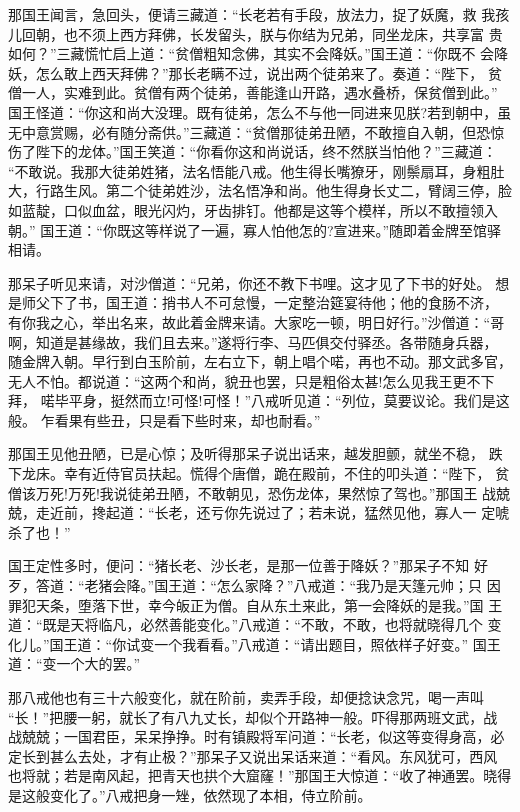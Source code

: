 那国王闻言，急回头，便请三藏道：“长老若有手段，放法力，捉了妖魔，救
我孩儿回朝，也不须上西方拜佛，长发留头，朕与你结为兄弟，同坐龙床，共享富
贵如何？”三藏慌忙启上道：“贫僧粗知念佛，其实不会降妖。”国王道：“你既不
会降妖，怎么敢上西天拜佛？”那长老瞒不过，说出两个徒弟来了。奏道：“陛下，
贫僧一人，实难到此。贫僧有两个徒弟，善能逢山开路，遇水叠桥，保贫僧到此。”
国王怪道：“你这和尚大没理。既有徒弟，怎么不与他一同进来见朕?若到朝中，虽
无中意赏赐，必有随分斋供。”三藏道：“贫僧那徒弟丑陋，不敢擅自入朝，但恐惊
伤了陛下的龙体。”国王笑道：“你看你这和尚说话，终不然朕当怕他？”三藏道：
“不敢说。我那大徒弟姓猪，法名悟能八戒。他生得长嘴獠牙，刚鬃扇耳，身粗肚
大，行路生风。第二个徒弟姓沙，法名悟净和尚。他生得身长丈二，臂阔三停，脸
如蓝靛，口似血盆，眼光闪灼，牙齿排钉。他都是这等个模样，所以不敢擅领入朝。”
国王道：“你既这等样说了一遍，寡人怕他怎的?宣进来。”随即着金牌至馆驿相请。

那呆子听见来请，对沙僧道：“兄弟，你还不教下书哩。这才见了下书的好处。
想是师父下了书，国王道：捎书人不可怠慢，一定整治筵宴待他；他的食肠不济，
有你我之心，举出名来，故此着金牌来请。大家吃一顿，明日好行。”沙僧道：“哥
啊，知道是甚缘故，我们且去来。”遂将行李、马匹俱交付驿丞。各带随身兵器，
随金牌入朝。早行到白玉阶前，左右立下，朝上唱个喏，再也不动。那文武多官，
无人不怕。都说道：“这两个和尚，貌丑也罢，只是粗俗太甚!怎么见我王更不下拜，
喏毕平身，挺然而立!可怪!可怪！”八戒听见道：“列位，莫要议论。我们是这般。
乍看果有些丑，只是看下些时来，却也耐看。”

那国王见他丑陋，已是心惊；及听得那呆子说出话来，越发胆颤，就坐不稳，
跌下龙床。幸有近侍官员扶起。慌得个唐僧，跪在殿前，不住的叩头道：“陛下，
贫僧该万死!万死!我说徒弟丑陋，不敢朝见，恐伤龙体，果然惊了驾也。”那国王
战兢兢，走近前，搀起道：“长老，还亏你先说过了；若未说，猛然见他，寡人一
定唬杀了也！”

国王定性多时，便问：“猪长老、沙长老，是那一位善于降妖？”那呆子不知
好歹，答道：“老猪会降。”国王道：“怎么家降？”八戒道：“我乃是天篷元帅；只
因罪犯天条，堕落下世，幸今皈正为僧。自从东土来此，第一会降妖的是我。”国
王道：“既是天将临凡，必然善能变化。”八戒道：“不敢，不敢，也将就晓得几个
变化儿。”国王道：“你试变一个我看看。”八戒道：“请出题目，照依样子好变。”
国王道：“变一个大的罢。”

那八戒他也有三十六般变化，就在阶前，卖弄手段，却便捻诀念咒，喝一声叫
“长！”把腰一躬，就长了有八九丈长，却似个开路神一般。吓得那两班文武，战
战兢兢；一国君臣，呆呆挣挣。时有镇殿将军问道：“长老，似这等变得身高，必
定长到甚么去处，才有止极？”那呆子又说出呆话来道：“看风。东风犹可，西风
也将就；若是南风起，把青天也拱个大窟窿！”那国王大惊道：“收了神通罢。晓得
是这般变化了。”八戒把身一矬，依然现了本相，侍立阶前。

